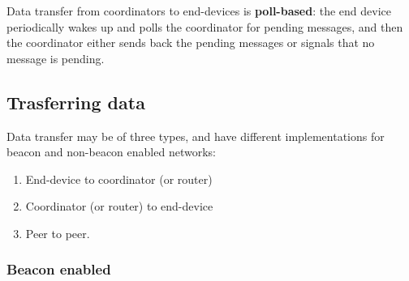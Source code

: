 Data transfer from coordinators to end-devices is
\textbf{poll-based}: the end device periodically wakes up and polls the coordinator for pending messages, and then the coordinator either sends back the pending messages or signals that no message is pending.


\subsection{Trasferring data}
Data transfer may be of three types, and have different implementations for beacon and non-beacon enabled networks:
\begin{enumerate}
   \item End-device to coordinator (or router)
   \item Coordinator (or router) to end-device
   \item Peer to peer.
\end{enumerate}

\newpage
\subsubsection{Beacon enabled}


